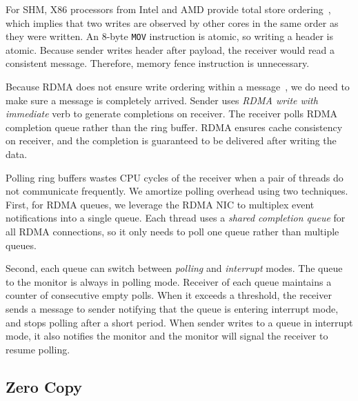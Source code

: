 For SHM, X86 processors from Intel and AMD provide total store ordering~\cite{sewell2010x86,intel-manual}, which implies that two writes are observed by other cores in the same order as they were written. An 8-byte \texttt{MOV} instruction is atomic, so writing a header is atomic. Because sender writes header after payload, the receiver would read a consistent message. Therefore, memory fence instruction is unnecessary.

Because RDMA does not ensure write ordering within a message~\cite{infiniband2000infiniband}, we do need to make sure a message is completely arrived. Sender uses \textit{RDMA write with immediate} verb to generate completions on receiver. The receiver polls RDMA completion queue rather than the ring buffer. RDMA ensures cache consistency on receiver, and the completion is guaranteed to be delivered after writing the data.


Polling ring buffers wastes CPU cycles of the receiver when a pair of threads do not communicate frequently. We amortize polling overhead using two techniques.
First, for RDMA queues, we leverage the RDMA NIC to multiplex event notifications into a single queue.
Each thread uses a \emph{shared completion queue} for all RDMA connections, so it only needs to poll one queue rather than multiple queues.

Second, each queue can switch between \textit{polling} and \textit{interrupt} modes. The queue to the monitor is always in polling mode. Receiver of each queue maintains a counter of consecutive empty polls. When it exceeds a threshold, the receiver sends a message to sender notifying that the queue is entering interrupt mode, and stops polling after a short period. When sender writes to a queue in interrupt mode, it also notifies the monitor and the monitor will signal the receiver to resume polling.


\subsection{Zero Copy}
\label{subsec:zerocopy}


